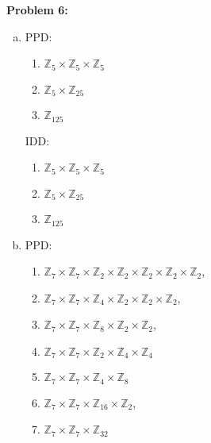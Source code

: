 \documentclass[12pt, letterpaper]{article}
\newenvironment{problem}
    [1]
    {\noindent \textbf{Problem #1:}}
    {\vspace{3mm}}
\begin{document}
\begin{problem}{6}
\begin{enumerate}[(a)]
        \item PPD:
        \begin{enumerate}[1.]
            \item $\mathbb{Z}_5 \times \mathbb{Z}_5 \times \mathbb{Z}_5$
            \item $\mathbb{Z}_5 \times \mathbb{Z}_{25}$
            \item $\mathbb{Z}_{125}$
        \end{enumerate}
        
        IDD:
        \begin{enumerate}[1.]
            \item $\mathbb{Z}_5 \times \mathbb{Z}_5 \times \mathbb{Z}_5$
            \item $\mathbb{Z}_5 \times \mathbb{Z}_{25}$
            \item $\mathbb{Z}_{125}$
        \end{enumerate}

        \item PPD:
        \begin{enumerate}[1.]
            \item $\mathbb{Z}_7 \times \mathbb{Z}_7 \times \mathbb{Z}_2 \times \mathbb{Z}_2 
                \times \mathbb{Z}_2 \times \mathbb{Z}_2 \times \mathbb{Z}_2$,
            \item $\mathbb{Z}_7 \times \mathbb{Z}_7 \times \mathbb{Z}_4 \times \mathbb{Z}_2 
                \times \mathbb{Z}_2 \times \mathbb{Z}_2$,
            \item $\mathbb{Z}_7 \times \mathbb{Z}_7 \times \mathbb{Z}_8 \times \mathbb{Z}_2 
                \times \mathbb{Z}_2$,
            \item $\mathbb{Z}_7 \times \mathbb{Z}_7 \times \mathbb{Z}_2 \times \mathbb{Z}_4 \times \mathbb{Z}_4$
            \item $\mathbb{Z}_7 \times \mathbb{Z}_7 \times \mathbb{Z}_4 \times \mathbb{Z}_8$
            \item $\mathbb{Z}_7 \times \mathbb{Z}_7 \times \mathbb{Z}_{16} \times \mathbb{Z}_2$,
            \item $\mathbb{Z}_7 \times \mathbb{Z}_7 \times \mathbb{Z}_{32}$
            

\end{enumerate}
\end{enumerate}
\end{problem}
\end{document}
